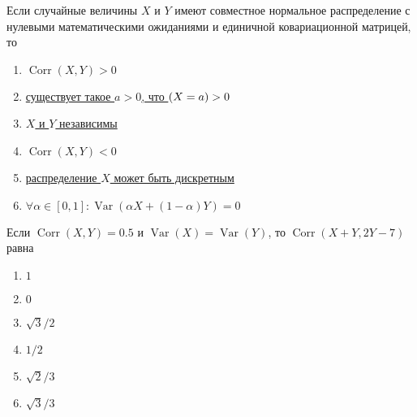 \documentclass[t]{beamer}
\DeclareMathOperator{\Var}{Var}
\DeclareMathOperator{\Corr}{Corr}
\let\P\relax
\DeclareMathOperator{\P}{\mathbb{P}}
\begin{document}
 \begin{frame} \label{14} 
\begin{block}{14} 

  Если случайные величины $X$ и $Y$ имеют совместное нормальное распределение с нулевыми математическими ожиданиями и единичной ковариационной матрицей, то


 \end{block} 
\begin{enumerate} 
\item[] \hyperlink{14-No}{\beamergotobutton{} $\Corr(X,Y)>0$}
\item[] \hyperlink{14-No}{\beamergotobutton{} существует такое $a>0$, что $\P(X=a)>0$}
\item[] \hyperlink{14-Yes}{\beamergotobutton{} $X$ и $Y$ независимы}
\item[] \hyperlink{14-No}{\beamergotobutton{} $\Corr(X,Y)<0$}
\item[] \hyperlink{14-No}{\beamergotobutton{} распределение $X$ может быть дискретным}
\item[] \hyperlink{14-No}{\beamergotobutton{} $\forall \alpha \in [0,1]: \Var(\alpha X + (1-\alpha)Y) = 0$}
\end{enumerate} 
\end{frame} 


 \begin{frame} \label{15} 
\begin{block}{15} 

  Если $\Corr(X, Y)= 0.5$ и $\Var(X)=\Var(Y)$, то $\Corr(X + Y, 2Y - 7)$ равна
  


 \end{block} 
\begin{enumerate} 
\item[] \hyperlink{15-No}{\beamergotobutton{} $1$}
\item[] \hyperlink{15-No}{\beamergotobutton{} $0$}
\item[] \hyperlink{15-Yes}{\beamergotobutton{} $\sqrt{3}/2$}
\item[] \hyperlink{15-No}{\beamergotobutton{} $1/2$}
\item[] \hyperlink{15-No}{\beamergotobutton{} $\sqrt{2}/3$}
\item[] \hyperlink{15-No}{\beamergotobutton{} $\sqrt{3}/3$}
\end{enumerate} 
\end{frame} 
\end{document}
